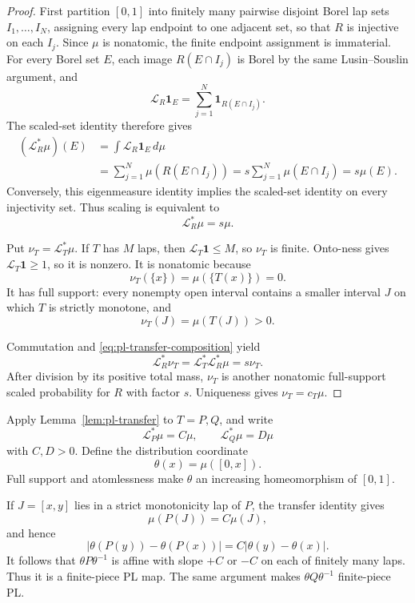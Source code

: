 \documentclass[11pt]{article}
\theoremstyle{definition}
\theoremstyle{remark}
\newcommand{\I}{[0,1]}
\begin{document}
\begin{proof}
First partition \(\I\) into finitely many pairwise disjoint Borel lap sets
\(I_1,\ldots,I_N\), assigning every lap endpoint to one adjacent set, so
that \(R\) is injective on each \(I_j\).  Since \(\mu\) is nonatomic, the
finite endpoint assignment is immaterial.  For every Borel set \(E\), each
image \(R(E\cap I_j)\) is Borel by the same Lusin--Souslin argument, and
\[
 \mathcal L_R\mathbf1_E
 =\sum_{j=1}^N\mathbf1_{R(E\cap I_j)}.
\]
The scaled-set identity therefore gives
\[
\begin{split}
 (\mathcal L_R^*\mu)(E)
 &=\int\mathcal L_R\mathbf1_E\,d\mu\\
 &=\sum_{j=1}^N\mu(R(E\cap I_j))
 =s\sum_{j=1}^N\mu(E\cap I_j)
 =s\mu(E).
\end{split}
\]
Conversely, this eigenmeasure identity implies the scaled-set identity on
every injectivity set.  Thus scaling is equivalent to
\begin{equation}\label{eq:pl-R-eigenmeasure}
 \mathcal L_R^*\mu=s\mu.
\end{equation}

Put \(\nu_T=\mathcal L_T^*\mu\).  If \(T\) has \(M\) laps, then
\(\mathcal L_T\mathbf1\leq M\), so \(\nu_T\) is finite.  Onto-ness gives
\(\mathcal L_T\mathbf1\geq1\), so it is nonzero.  It is nonatomic because
\[
 \nu_T(\{x\})=\mu(\{T(x)\})=0.
\]
It has full support: every nonempty open interval contains a smaller interval
\(J\) on which \(T\) is strictly monotone, and
\[
 \nu_T(J)=\mu(T(J))>0.
\]

Commutation and \eqref{eq:pl-transfer-composition} yield
\[
 \mathcal L_R^*\nu_T
 =\mathcal L_T^*\mathcal L_R^*\mu
 =s\nu_T.
\]
After division by its positive total mass, \(\nu_T\) is another nonatomic
full-support scaled probability for \(R\) with factor \(s\).  Uniqueness
gives \(\nu_T=c_T\mu\).
\end{proof}

Apply Lemma~\ref{lem:pl-transfer} to \(T=P,Q\), and write
\[
 \mathcal L_P^*\mu=C\mu,\qquad
 \mathcal L_Q^*\mu=D\mu
\]
with \(C,D>0\).  Define the distribution coordinate
\begin{equation}\label{eq:pl-distribution}
 \theta(x)=\mu([0,x]).
\end{equation}
Full support and atomlessness make \(\theta\) an increasing homeomorphism of
\(\I\).

If \(J=[x,y]\) lies in a strict monotonicity lap of \(P\), the transfer
identity gives
\[
 \mu(P(J))=C\mu(J),
\]
and hence
\[
 |\theta(P(y))-\theta(P(x))|
 =C|\theta(y)-\theta(x)|.
\]
It follows that \(\theta P\theta^{-1}\) is affine with slope \(+C\) or
\(-C\) on each of finitely many laps.  Thus it is a finite-piece PL map.
The same argument makes \(\theta Q\theta^{-1}\) finite-piece PL.
\end{document}
